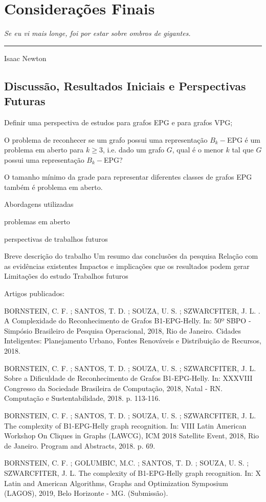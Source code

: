 \chapter{Considerações Finais}\label{conclusao}

\begin{flushright}
\begin{minipage}[t][0cm][b]{0.47\textwidth}
\emph{
Se eu vi mais longe, foi por estar sobre ombros de gigantes.}
\end{minipage}

\rule[0cm]{7cm}{0.03cm}%

Isaac Newton
\end{flushright}

\section{Discussão, Resultados Iniciais e Perspectivas Futuras}

Definir uma perspectiva de estudos para grafos EPG e para grafos VPG;

 O problema de reconhecer se um grafo possui uma representação $B_{k}-$EPG é um problema em aberto para $k\geq 3$, i.e. dado um grafo $G$, qual é o menor $k$ tal que $G$ possui uma representação $B_{k}-$EPG?

O tamanho mínimo da grade para representar diferentes classes de grafos EPG também é problema em aberto.

Abordagens utilizadas

problemas em aberto

perspectivas de trabalhos futuros

Breve descrição do trabalho
Um resumo das conclusões da pesquisa
Relação com as evidências existentes
Impactos e implicações que os resultados podem gerar
Limitações do estudo
Trabalhos futuros

Artigos publicados:

BORNSTEIN, C. F. ; SANTOS, T. D. ; SOUZA, U. S. ; SZWARCFITER, J. L. . A Complexidade do Reconhecimento de Grafos B1-EPG-Helly. In: 50º SBPO - Simpósio Brasileiro de Pesquisa Operacional, 2018, Rio de Janeiro. Cidades Inteligentes: Planejamento Urbano, Fontes Renováveis e Distribuição de Recursos, 2018.

BORNSTEIN, C. F. ; SANTOS, T. D. ; SOUZA, U. S. ; SZWARCFITER, J. L. Sobre a Dificuldade de Reconhecimento de Grafos B1-EPG-Helly. In: XXXVIII Congresso da Sociedade Brasileira de Computação, 2018, Natal - RN. Computação e Sustentabilidade, 2018. p. 113-116.

BORNSTEIN, C. F. ; SANTOS, T. D. ; SOUZA, U. S. ; SZWARCFITER, J. L. The complexity of B1-EPG-Helly graph recognition. In: VIII Latin American Workshop On Cliques in Graphs (LAWCG), ICM 2018 Satellite Event, 2018, Rio de Janeiro. Program and Abstracts, 2018. p. 69.

BORNSTEIN, C. F. ; GOLUMBIC, M.C. ; SANTOS, T. D. ; SOUZA, U. S. ; SZWARCFITER, J. L.  The complexity of B1-EPG-Helly graph recognition. In:  X Latin and American Algorithms, Graphs and Optimization Symposium (LAGOS),  2019, Belo Horizonte - MG. (Submissão).